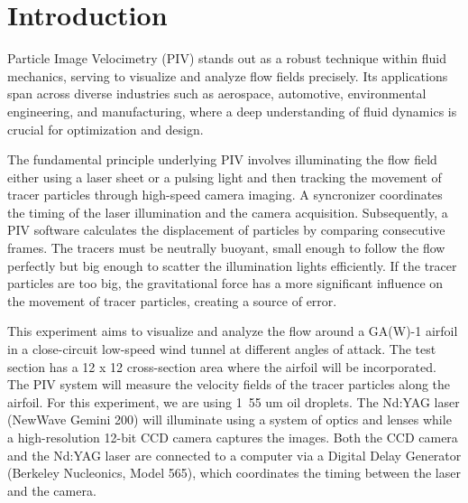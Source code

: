 \chapter{Introduction}
\label{cp:introduction}
Particle Image Velocimetry (PIV) stands out as a robust technique within fluid mechanics, serving to visualize and analyze flow fields precisely. Its applications span across diverse industries such as aerospace, automotive, environmental engineering, and manufacturing, where a deep understanding of fluid dynamics is crucial for optimization and design.

The fundamental principle underlying PIV involves illuminating the flow field either using a laser sheet or a pulsing light and then tracking the movement of tracer particles through high-speed camera imaging. A syncronizer coordinates the timing of the laser illumination and the camera acquisition. Subsequently, a PIV software calculates the displacement of particles by comparing consecutive frames. The tracers must be neutrally buoyant, small enough to follow the flow perfectly but big enough to scatter the illumination lights efficiently. If the tracer particles are too big, the gravitational force has a more significant influence on the movement of tracer particles, creating a source of error. 

This experiment aims to visualize and analyze the flow around a GA(W)-1 airfoil in a close-circuit low-speed wind tunnel at different angles of attack. The test section has a 12 x 12 cross-section area where the airfoil will be incorporated. The PIV system will measure the velocity fields of the tracer particles along the airfoil. For this experiment, we are using 1~55 um oil droplets. The Nd:YAG laser (NewWave Gemini 200) will illuminate using a system of optics and lenses while a high-resolution 12-bit CCD camera captures the images. Both the  CCD camera and the Nd:YAG laser are connected to a computer via a Digital Delay Generator (Berkeley Nucleonics, Model 565), which coordinates the timing between the laser and the camera. 


